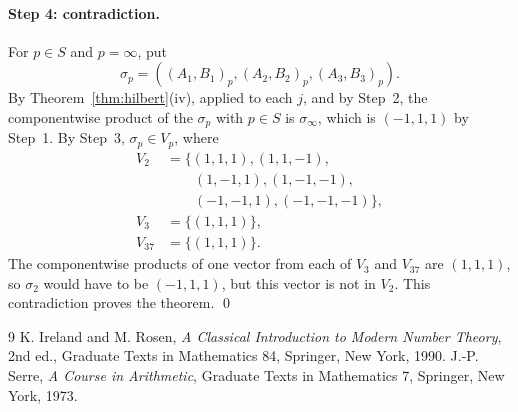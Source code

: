 \documentclass[11pt]{article}
\begin{document}
\paragraph{Step 4: contradiction.} For $p\in S$ and $p=\infty$, put \[\sigma_p=((A_{1},B_{1})_p,(A_{2},B_{2})_p,(A_{3},B_{3})_p).\] By Theorem~\ref{thm:hilbert}(iv), applied to each $j$, and by Step~2, the componentwise product of the $\sigma_p$ with $p\in S$ is $\sigma_\infty$, which is $(-1,1,1)$ by Step~1. By Step~3, $\sigma_p\in V_p$, where
\begin{align*}
V_{2}&=\{(1,1,1),(1,1,-1),\\
&\qquad(1,-1,1),(1,-1,-1),\\
&\qquad(-1,-1,1),(-1,-1,-1)\},\\
V_{3}&=\{(1,1,1)\},\\
V_{37}&=\{(1,1,1)\}.
\end{align*}The componentwise products of one vector from each of $V_{3}$ and $V_{37}$ are $(1,1,1)$, so $\sigma_{2}$ would have to be $(-1,1,1)$, but this vector is not in $V_{2}$. This contradiction proves the theorem.
\qed

\begin{thebibliography}{9}
 K. Ireland and M. Rosen, \emph{A Classical Introduction to Modern Number Theory}, 2nd ed., Graduate Texts in Mathematics 84, Springer, New York, 1990.
 J.-P. Serre, \emph{A Course in Arithmetic}, Graduate Texts in Mathematics 7, Springer, New York, 1973.
\end{thebibliography}
\end{document}
